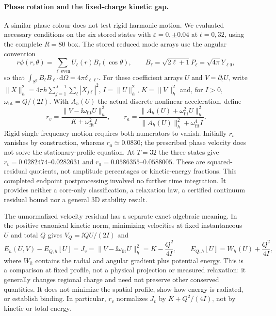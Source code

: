 \paragraph{Phase rotation and the fixed-charge kinetic gap.}
A similar phase colour does not test rigid harmonic motion. We evaluated
necessary conditions on the six stored states with $\varepsilon=0,\pm0.04$
at $t=0,32$, using the complete $R=80$ box. The stored reduced mode arrays
use the angular convention
\[
 r\phi(r,\theta)=\sum_{\ell\ \mathrm{even}}U_\ell(r)B_\ell(\cos\theta),
 \qquad B_\ell=\sqrt{2\ell+1}P_\ell=\sqrt{4\pi}Y_{\ell0},
\]
so that $\int_{S^2}B_\ell B_{\ell'}\,\mathrm d\Omega=4\pi\delta_{\ell\ell'}$.
For these coefficient arrays $U$ and $V=\partial_t U$, write
$\|X\|_h^2=4\pi h\sum_{j=1}^{J-1}\sum_\ell|X_{j\ell}|^2$,
$I=\|U\|_h^2$, $K=\|V\|_h^2$ and, for $I>0$,
$\omega_{\mathrm{fit}}=Q/(2I)$.
With $A_h(U)$ the actual discrete nonlinear acceleration, define
\[
 r_v=\frac{\|V-\ii\omega_{\mathrm{fit}}U\|_h^2}{K+\omega_{\mathrm{fit}}^2 I},
 \qquad
 r_a=\frac{\|A_h(U)+\omega_{\mathrm{fit}}^2 U\|_h^2}
                 {\|A_h(U)\|_h^2+\omega_{\mathrm{fit}}^4 I}.
\]
Rigid single-frequency motion requires both numerators to vanish. Initially
$r_v$ vanishes by construction, whereas $r_a\simeq0.0830$; the prescribed
phase velocity does not solve the stationary-profile equation. At $T=32$
the three states give $r_v=0.0282474$--$0.0282631$ and
$r_a=0.0586355$--$0.0588005$. These are squared-residual quotients, not
amplitude percentages or kinetic-energy fractions. This completed endpoint
postprocessing involved no further time integration. It provides neither a core-only classification,
a relaxation law, a certified continuum residual bound nor a general 3D
stability result.

The unnormalized velocity residual has a separate exact algebraic meaning.
In the positive canonical kinetic norm, minimizing velocities at fixed
instantaneous $U$ and total $Q$ gives $V_Q=\ii Q U/(2I)$ and
\[
 E_h(U,V)-E_{Q,h}[U]
 =J_v=\|V-\ii\omega_{\mathrm{fit}}U\|_h^2
 =K-\frac{Q^2}{4I},\qquad
 E_{Q,h}[U]=W_h(U)+\frac{Q^2}{4I},
\]
where $W_h$ contains the radial and angular gradient plus potential energy.
This is a comparison at fixed profile, not a physical projection or measured
relaxation: it generally changes regional charge and need not preserve
other conserved quantities. It does not minimize the spatial profile,
show how energy is radiated, or establish binding. In particular, $r_v$
normalizes $J_v$ by $K+Q^2/(4I)$, not by kinetic or total energy.
